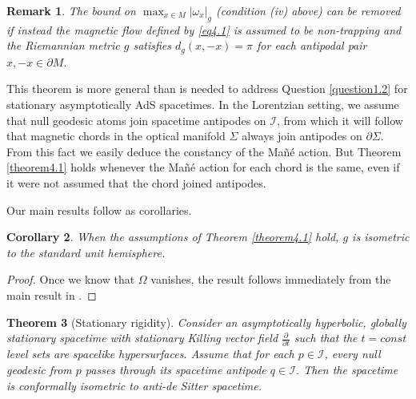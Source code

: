 \documentclass[12pt]{amsart}
\numberwithin{equation}{section}
\newtheorem{theorem}{Theorem}[section]
\newtheorem{remark}[theorem]{Remark}
\newtheorem{corollary}[theorem]{Corollary}
\begin{document}
\begin{remark}\label{remark4.2}
The bound on $\max_{x\in M}|\omega_{x}|_{g}$ (condition (iv) above) can be removed if instead the magnetic flow defined by \eqref{eq4.1} is assumed to be non-trapping and the Riemannian metric $g$ satisfies $d_{g}(x,-x)=\pi$ for each antipodal pair $x, -x\in \partial M$.
\end{remark}

This theorem is more general than is needed to address Question \ref{question1.2} for stationary asymptotically AdS spacetimes. In the Lorentzian setting, we assume that null geodesic
atoms
join spacetime antipodes on ${\mathcal I}$, from which it will follow that magnetic chords in the optical manifold $\Sigma$ always join antipodes on $\partial \Sigma$. From this fact we easily deduce the constancy of the Ma\~n\'e action. But Theorem \ref{theorem4.1} holds whenever the Ma\~n\'e action for each chord is the same, even if it were not assumed that the chord joined antipodes.

Our main results follow as corollaries.
\begin{corollary}\label{corollary4.3}
When the assumptions of Theorem \ref{theorem4.1} hold, $g$ is isometric to the standard unit hemisphere.
\end{corollary}

\begin{proof}
Once we know that $\Omega$ vanishes, the result follows immediately from the main result in \cite{Bangert}.
\end{proof}

\begin{theorem}[Stationary rigidity] \label{theorem4.4}
Consider an asymptotically hyperbolic, globally stationary spacetime with stationary Killing vector field $\frac{\partial}{\partial t}$ such that the $t=const$ level sets are spacelike hypersurfaces. Assume that for each $p\in {\mathcal I}$, every null geodesic from $p$ passes through its spacetime antipode $q\in {\mathcal I}$. Then the spacetime is conformally isometric to anti-de Sitter spacetime.
\end{theorem}
\end{document}
